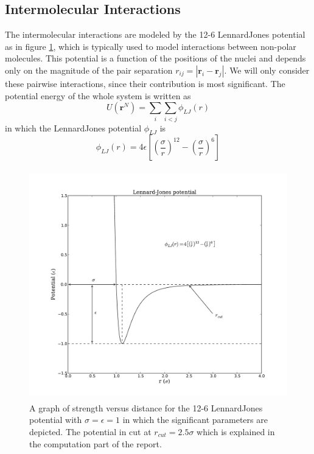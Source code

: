 \documentclass{article}
\begin{document}
\subsection{Intermolecular Interactions}
The intermolecular interactions are modeled by the 12-6 Lennard\text{-}Jones potential as in figure \ref{fig:LJ}, which is typically used to model interactions between non-polar molecules. This potential is a function of the positions of the nuclei and depends only on the magnitude of the pair separation $r_{ij}= \left| \mathbf{r}_i - \mathbf{r}_j \right|$. We will only consider these pairwise interactions, since their contribution is most significant. The potential energy of the whole system is written as
\begin{equation}
\label{pot}
 U\left(  \mathbf{r}^N \right) = \sum_{i} \sum_{i<j} \phi_{LJ}(r)
\end{equation}
in which the Lennard\text{-}Jones potential $\phi_{LJ}$ is
\begin{equation}
 \phi_{LJ}(r) = 4\epsilon \left[  \left(  \frac{\sigma}{r}\right)^{12} - \left(  \frac{\sigma}{r}\right)^{6} \right]
\end{equation}


\begin{figure}[!htb]
  \centering
    \includegraphics[height=100mm]{LJ.pdf}
  \caption[]{A graph of strength versus distance for the 12-6 Lennard\text{-}Jones potential with $\sigma=\epsilon=1$ in which the significant parameters are depicted. The potential in cut at $r_{cut}=2.5 \sigma$ which is explained in the computation part of the report.}
  \label{fig:LJ}
\end{figure}
\end{document}
